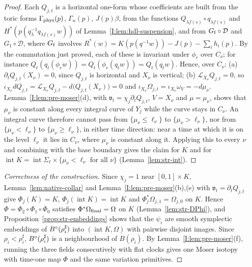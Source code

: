 \begin{proof}
Each $Q_{j,t}$ is a horizontal one-form whose coefficients are built from the toric forms $\Gamma_{\rm phys}(p)$, $\Gamma_n(p)$,
$J(p)\beta$, from the functions $Q_{\lambda f(s)}\circ q_{\lambda f(s)}$ and $H^*(p(q_\lambda^{-1}q_{\lambda f(s)}w))$ of
Lemma~\ref{I:lem:hdl-suspension}, and from $G_{\rm f}\circ\mathcal D$ and $G_1\circ\mathcal D$, where $G_{\rm f}$ involves
$R^*(w)=K(p(q^{-1}w))-J(p)-\sum_ih_i(p)$. By the commutation just proved, each of these is invariant under $\phi_r$ over $C_\nu$;
for instance $Q_t(q_t(\phi_rw))=Q_t(\phi_r(q_tw))=Q_t(q_tw)$. Hence, over $C_\nu$: (a) $\partial_tQ_{j,t}(X_\nu)=0$, since $Q_{j,t}$
is horizontal and $X_\nu$ is vertical; (b) $\mathcal L_{X_\nu}Q_{j,t}=0$, so $\iota_{X_\nu}dQ_{j,t}=\mathcal
L_{X_\nu}Q_{j,t}-d\bigl(Q_{j,t}(X_\nu)\bigr)=0$ and $\iota_{X_\nu}\Omega_{j,t}=\iota_{X_\nu}\omega_V=-d\mu_\nu$.
Lemma~\ref{I:lem:pre-moser}(d), with $\mathfrak v_t=\chi_j\partial_tQ_{j,t}$, $V=X_\nu$ and $\mu=\mu_\nu$, shows that $\mu_\nu$ is
constant along every integral curve of $Y_j$ while the curve stays in $C_\nu$. An integral curve therefore cannot pass from
$\{\mu_\nu\le\ell_\nu\}$ to $\{\mu_\nu>\ell_\nu\}$, nor from $\{\mu_\nu<\ell_\nu\}$ to $\{\mu_\nu\ge\ell_\nu\}$, in either time
direction: near a time at which it is on the level $\ell_\nu$ it lies in $C_\nu$, where $\mu_\nu$ is constant along it. Applying
this to every $\nu$ and combining with the base boundary gives the claim for $K$ and for
$\operatorname{int}K=\operatorname{int}\Sigma_\ell\times\{\mu_\nu<\ell_\nu\text{ for all }\nu\}$ (Lemma~\ref{lem:str-int}).
\end{proof}

\begin{proof}[Correctness of the construction]
Since $\chi_j=1$ near $[0,1]\times K$, Lemma~\ref{lem:native-collar} and Lemma~\ref{I:lem:pre-moser}(b),(e) with $\mathfrak
v_t=\partial_tQ_{j,t}$ give $\Phi_j(K)=K$, $\Phi_j(\operatorname{int}K)=\operatorname{int}K$ and $\Phi_j^*\Omega_{j,1}=\Omega_{j,0}$
on $K$. Hence $\Phi=\Phi_2\circ\Phi_1\circ\Phi_0$ satisfies $\Phi^*\Omega_{\rm final}=\Omega$ on $K$ (Lemma~\ref{lem:str-DPhi}), and
Proposition~\ref{prop:str-embeddings} shows that the $\psi_i$ are smooth symplectic embeddings of $B^{\circ}(\rho_i^\sharp)$ into
$(\operatorname{int}K,\Omega)$ with pairwise disjoint images. Since $\rho_i<\rho_i^\sharp$, $B^{\circ}(\rho_i^\sharp)$ is a neighbourhood
of $B(\rho_i)$. By Lemma~\ref{I:lem:pre-moser}(f), running the three fields consecutively with flat clocks gives one Moser isotopy
with time-one map $\Phi$ and the same variation primitives.
\end{proof}
